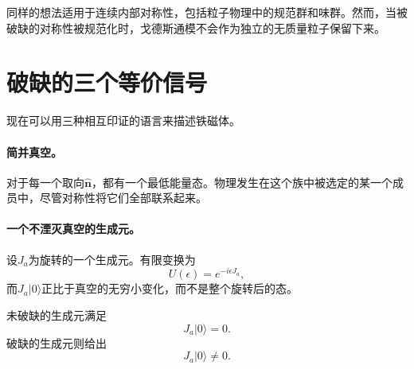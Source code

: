 
同样的想法适用于连续内部对称性，包括粒子物理中的规范群和味群。然而，当被破缺的对称性被规范化时，戈德斯通模不会作为独立的无质量粒子保留下来。

\begin{classroomqa}
\end{classroomqa}

\section{破缺的三个等价信号}

现在可以用三种相互印证的语言来描述铁磁体。

\paragraph{简并真空。}
对于每一个取向\(\hat{\mathbf n}\)，都有一个最低能量态。物理发生在这个族中被选定的某一个成员中，尽管对称性将它们全部联系起来。

\paragraph{一个不湮灭真空的生成元。}
设\(J_a\)为旋转的一个生成元。有限变换为
\begin{equation}
U(\epsilon)=e^{-i\epsilon J_a},
\end{equation}
而\(J_a|0\rangle\)正比于真空的无穷小变化，而不是整个旋转后的态。

\begin{classroomqa}
\end{classroomqa}

未破缺的生成元满足
\begin{equation}
J_a|0\rangle=0.
\label{eq:l9-unbroken-generator}
\end{equation}
破缺的生成元则给出
\begin{equation}
J_a|0\rangle\neq0.
\label{eq:l9-broken-generator}
\end{equation}


